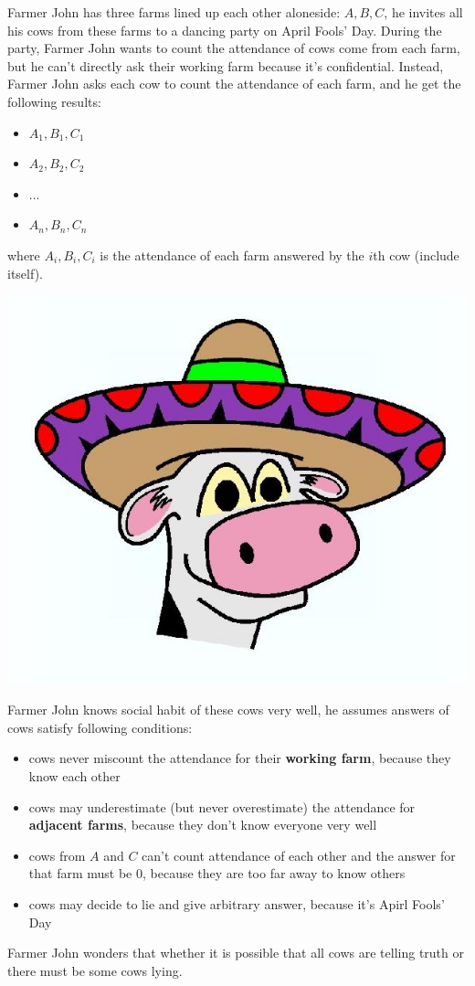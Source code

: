Farmer John has three farms lined up each other aloneside: $A, B, C$,
he invites all his cows from these farms to a dancing party on April Fools' Day.
During the party, Farmer John wants to count the attendance of cows come from each farm,
but he can't directly ask their working farm because it's confidential.
Instead, Farmer John asks each cow to count the attendance of each farm, and he get the following results:
\begin{itemize}
  \item $A_1, B_1, C_1$
  \item $A_2, B_2, C_2$
  \item $\ldots$
  \item $A_n, B_n, C_n$
\end{itemize}
where $A_i, B_i, C_i$ is the attendance of each farm answered by the $i$th cow (include itself).

\begin{center}
  \includegraphics[scale=0.3, natwidth=623, natheight=526]{cows.jpg}
\end{center}

Farmer John knows social habit of these cows very well, he assumes answers of cows satisfy following conditions:
\begin{itemize}
  \item cows never miscount the attendance for their \textbf{working farm}, because they know each other
  \item cows may underestimate (but never overestimate) the attendance for \textbf{adjacent farms}, because they don't know everyone very well
  \item cows from $A$ and $C$ can't count attendance of each other and the answer for that farm must be $0$, because they are too far away to know others 
  \item cows may decide to lie and give arbitrary answer, because it's Apirl Fools' Day
\end{itemize}

Farmer John wonders that whether it is possible that all cows are telling truth or there must be some cows lying.
